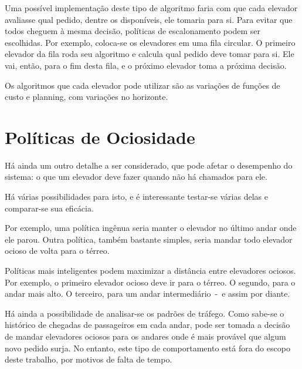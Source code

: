 Uma possível implementação deste tipo de algoritmo faria com que cada elevador
avaliasse qual pedido, dentre os disponíveis, ele tomaria para si. Para evitar
que todos cheguem à mesma decisão, políticas de escalonamento podem ser
escolhidas. Por exemplo, coloca-se os elevadores em uma fila circular. O
primeiro elevador da fila roda seu algoritmo e calcula qual pedido deve tomar
para si. Ele vai, então, para o fim desta fila, e o próximo elevador toma a
próxima decisão.

Os algoritmos que cada elevador pode utilizar são as variações de funções de
custo e planning, com variações no horizonte.

\section{Políticas de Ociosidade}

Há ainda um outro detalhe a ser considerado, que pode afetar o desempenho do
sistema: o que um elevador deve fazer quando não há chamados para ele.

Há várias possibilidades para isto, e é interessante testar-se várias delas e
comparar-se sua eficácia.

Por exemplo, uma política ingênua seria manter o elevador no último andar onde
ele parou. Outra política, também bastante simples, seria mandar todo elevador
ocioso de volta para o térreo.

Políticas mais inteligentes podem maximizar a distância entre elevadores
ociosos. Por exemplo, o primeiro elevador ocioso deve ir para o térreo. O
segundo, para o andar mais alto. O terceiro, para um andar intermediário~-~e
assim por diante.

Há ainda a possibilidade de analisar-se os padrões de tráfego. Como sabe-se o
histórico de chegadas de passageiros em cada andar, pode ser tomada a decisão de
mandar elevadores ociosos para os andares onde é mais provável que algum novo
pedido surja. No entanto, este tipo de comportamento está fora do escopo deste
trabalho, por motivos de falta de tempo.